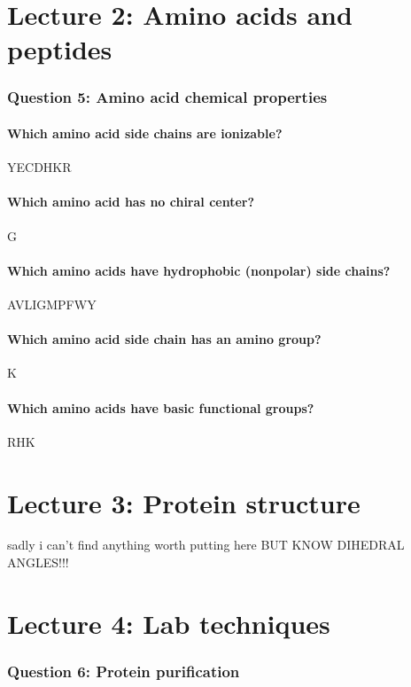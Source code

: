 \documentclass[letterpaper, 12pt]{article}
\begin{document}
\section*{Lecture 2: Amino acids and peptides}

\subsubsection*{Question 5: Amino acid chemical properties}

\paragraph{Which amino acid side chains are ionizable?} YECDHKR

\paragraph{Which amino acid has no chiral center?} G

\paragraph{Which amino acids have hydrophobic (nonpolar) side chains?} AVLIGMPFWY

\paragraph{Which amino acid side chain has an amino group?} K

\paragraph{Which amino acids have basic functional groups?} RHK

\section*{Lecture 3: Protein structure}

sadly i can't find anything worth putting here BUT KNOW DIHEDRAL ANGLES!!!

\section*{Lecture 4: Lab techniques}

\subsubsection*{Question 6: Protein purification}
\end{document}
